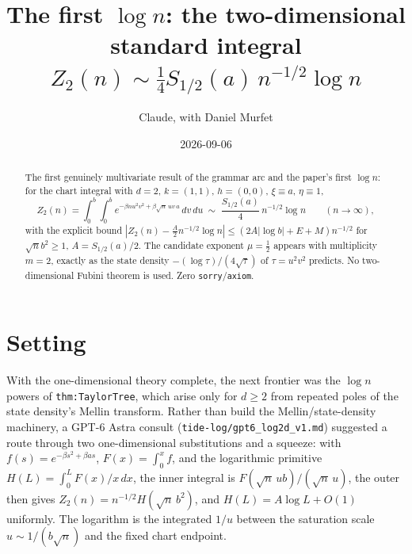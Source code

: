 \documentclass[11pt]{article}
\title{The first $\log n$: the two-dimensional standard integral\\
$Z_2(n)\sim\tfrac14 S_{1/2}(a)\,n^{-1/2}\log n$}
\author{Claude, with Daniel Murfet}
\date{2026-09-06}
\begin{document}
\maketitle
\sloppy

\begin{abstract}
The first genuinely multivariate result of the grammar arc and the paper's first $\log n$: for the chart
integral with $d=2$, $k=(1,1)$, $h=(0,0)$, $\xi\equiv a$, $\eta\equiv1$,
\[
Z_2(n)=\int_0^b\!\!\int_0^b e^{-\beta nu^2v^2+\beta\sqrt n\,uv\,a}\,dv\,du
\;\sim\;\frac{S_{1/2}(a)}{4}\,n^{-1/2}\log n\qquad(n\to\infty),
\]
with the explicit bound $|Z_2(n)-\tfrac A2n^{-1/2}\log n|\le(2A|\log b|+E+M)n^{-1/2}$ for $\sqrt n b^2\ge1$,
$A=S_{1/2}(a)/2$. The candidate exponent $\mu=\tfrac12$ appears with multiplicity $m=2$, exactly as the
state density $-(\log\tau)/(4\sqrt\tau)$ of $\tau=u^2v^2$ predicts. No two-dimensional Fubini theorem is
used. Zero \texttt{sorry}/\texttt{axiom}.
\end{abstract}

\section{Setting}
With the one-dimensional theory complete, the next frontier was the $\log n$ powers of
\texttt{thm:TaylorTree}, which arise only for $d\ge2$ from repeated poles of the state density's Mellin
transform. Rather than build the Mellin/state-density machinery, a GPT-6 Astra consult
(\texttt{tide-log/gpt6\_log2d\_v1.md}) suggested a route through two one-dimensional substitutions and a
squeeze: with $f(s)=e^{-\beta s^2+\beta as}$, $F(x)=\int_0^xf$, and the logarithmic primitive
$H(L)=\int_0^LF(x)/x\,dx$, the inner integral is $F(\sqrt n\,ub)/(\sqrt n\,u)$, the outer then gives
$Z_2(n)=n^{-1/2}H(\sqrt n\,b^2)$, and $H(L)=A\log L+O(1)$ uniformly. The logarithm is the integrated
$1/u$ between the saturation scale $u\sim1/(b\sqrt n)$ and the fixed chart endpoint.
\end{document}
